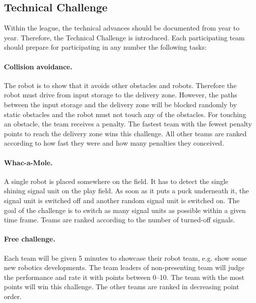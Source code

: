 \documentclass[12pt,twoside]{article}
\newenvironment{rulechange}{}{}
\begin{document}
\begin{rulechange}
  \subsection{Technical Challenge}
  
  Within the league, the technical advances should be documented from
  year to year. Therefore, the Technical Challenge is introduced.
  Each participating team should prepare for participating in any
  number the following tasks:


  \paragraph{Collision avoidance.~}
  The robot is to show that it avoids other obstacles and robots.
  Therefore the robot must drive from input storage to the delivery zone.
  However, the paths between the input storage and the delivery zone will
  be blocked randomly by static obstacles and the robot must not touch any
  of the obstacles. For touching an obstacle, the team receives a penalty.
  The fastest team with the fewest penalty points to reach the delivery
  zone wins this challenge. All other teams are ranked according to
  how fast they were and how many penalties they conceived.
  
  \paragraph{Whac-a-Mole.~}
  A single robot is placed somewhere on the field. It has to detect
  the single shining signal unit on the play field. As soon as it puts
  a puck underneath it, the signal unit is switched off and another
  random signal unit is switched on. The goal of the challenge is to
  switch as many signal units as possible within a given time
  frame. Teams are ranked according to the number of turned-off
  signals.
  

  \paragraph{Free challenge.~}
  Each team will be given 5 minutes to showcase their robot team, e.g.
  show some new robotics developments. The team leaders of
  non-presenting team will judge the performance and rate it with
  points between 0--10.  The team with the most points will win this
  challenge. The other teams are ranked in decreasing point order.



\end{rulechange}
\end{document}
